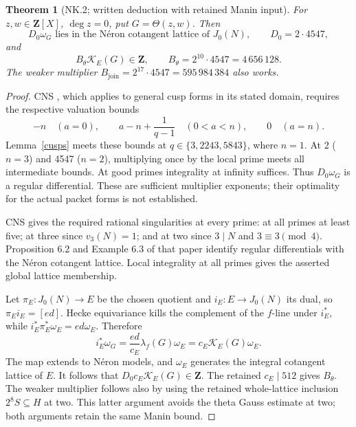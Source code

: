 \documentclass[11pt]{article}
\newcommand{\Z}{\mathbf Z}
\newcommand{\K}{\mathscr K_E}
\newtheorem{theorem}{Theorem}
\begin{document}
\begin{theorem}[NK.2; written deduction with retained Manin input]\label{lattice}
For $z,w\in\Z[X]$, $\deg z=0$, put $G=\Theta(z,w)$. Then
\[
 D_0\omega_G\text{ lies in the N\'eron cotangent lattice of }J_0(N),
 \qquad D_0=2\cdot4547,
\]
and
\[
 \boxed{B_\theta\K(G)\in\Z,\qquad
 B_\theta=2^{10}\cdot4547=4\,656\,128.}
\]
The weaker multiplier $B_{\mathrm{join}}=2^{17}\cdot4547=595\,984\,384$
also works.
\end{theorem}
\begin{proof}
CNS \cite[Proposition 5.14]{cns}, which applies to general cusp forms
in its stated domain, requires the respective valuation bounds
\[
 -n\quad(a=0),\qquad
 a-n+\frac1{q-1}\quad(0<a<n),\qquad0\quad(a=n).
\]
Lemma~\ref{cusps} meets these bounds at $q\in\{3,2243,5843\}$,
where $n=1$. At 2 ($n=3$) and 4547 ($n=2$), multiplying once by the
local prime meets all intermediate bounds. At good primes integrality
at infinity suffices. Thus $D_0\omega_G$ is a regular differential.
These are sufficient multiplier exponents; their optimality for the
actual packet forms is not established.

CNS \cite[Theorem 6.12]{cns} gives the required rational singularities
at every prime: at all primes at least five; at three since $v_3(N)=1$;
and at two since $3\mid N$ and $3\equiv3\pmod4$.
Proposition 6.2 and Example 6.3 of that paper identify regular
differentials with the N\'eron cotangent lattice. Local integrality
at all primes gives the asserted global lattice membership.

Let $\pi_E:J_0(N)\to E$ be the chosen quotient and $i_E:E\to J_0(N)$
its dual, so $\pi_Ei_E=[ed]$. Hecke equivariance kills the complement
of the $f$-line under $i_E^*$, while
$i_E^*\pi_E^*\omega_E=ed\omega_E$. Therefore
\[
 i_E^*\omega_G=\frac{ed}{c_E}\lambda_f(G)\omega_E
             =c_E\K(G)\omega_E.
\]
The map extends to N\'eron models, and $\omega_E$ generates the
integral cotangent lattice of $E$. It follows that
$D_0c_E\K(G)\in\Z$. The retained $c_E\mid512$ gives $B_\theta$.
The weaker multiplier follows also by using the retained whole-lattice
inclusion $2^8S\subseteq H$ at two. This latter argument avoids the
theta Gauss estimate at two; both arguments retain the same Manin bound.
\end{proof}
\end{document}
